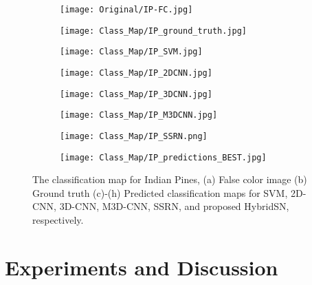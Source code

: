 \documentclass[journal]{IEEEtran}
\begin{document}
\begin{figure*}[!t]
\begin{subfigure}{.255\columnwidth}
\centering
\texttt{[image: Original/IP-FC.jpg]}\caption{}
\end{subfigure}\begin{subfigure}{.255\columnwidth}
\centering
\texttt{[image: Class\_Map/IP\_ground\_truth.jpg]}\caption{}
\end{subfigure}\begin{subfigure}{.255\columnwidth}
\centering
\texttt{[image: Class\_Map/IP\_SVM.jpg]}\caption{}
\end{subfigure}\begin{subfigure}{.255\columnwidth}
\centering
\texttt{[image: Class\_Map/IP\_2DCNN.jpg]}\caption{}
\end{subfigure}\begin{subfigure}{.255\columnwidth}
\centering
\texttt{[image: Class\_Map/IP\_3DCNN.jpg]}\caption{}
\end{subfigure}\begin{subfigure}{.255\columnwidth}
\centering
\texttt{[image: Class\_Map/IP\_M3DCNN.jpg]}\caption{}
\end{subfigure}\begin{subfigure}{.255\columnwidth}
\centering
\texttt{[image: Class\_Map/IP\_SSRN.png]}\caption{}
\end{subfigure}\begin{subfigure}{.255\columnwidth}
\centering
\texttt{[image: Class\_Map/IP\_predictions\_BEST.jpg]}\caption{}
\end{subfigure}
\caption{The classification map for Indian Pines, (a) False color image (b) Ground truth (c)-(h) Predicted classification maps for SVM, 2D-CNN, 3D-CNN, M3D-CNN, SSRN, and proposed HybridSN, respectively.}
\label{fig:map_IP}
\end{figure*}




\section{Experiments and Discussion}
\end{document}
